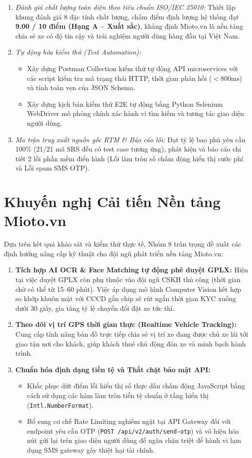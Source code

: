 \documentclass[12pt,a4paper,oneside]{report}
\begin{document}
\begin{enumerate}
  \item \textit{Đánh giá chất lượng toàn diện theo tiêu chuẩn ISO/IEC 25010:} Thiết lập khung đánh giá 8 đặc tính chất lượng, chấm điểm định lượng hệ thống đạt \textbf{9.00 / 10 điểm (Hạng A -- Xuất sắc)}, khẳng định Mioto.vn là nền tảng chia sẻ xe có độ tin cậy và trải nghiệm người dùng hàng đầu tại Việt Nam.
  \item \textit{Tự động hóa kiểm thử (Test Automation):}
    \begin{itemize}
      \item Xây dựng Postman Collection kiểm thử tự động API microservices với các script kiểm tra mã trạng thái HTTP, thời gian phản hồi ($< 800\text{ms}$) và tính toàn vẹn của JSON Schema.
      \item Xây dựng kịch bản kiểm thử E2E tự động bằng Python Selenium WebDriver mô phỏng chính xác hành vi tìm kiếm và tương tác giao diện người dùng.
    \end{itemize}
  \item \textit{Ma trận truy xuất nguồn gốc RTM \& Báo cáo lỗi:} Đạt tỷ lệ bao phủ yêu cầu 100\% (21/21 mã SRS đều có test case tương ứng), phát hiện và báo cáo chi tiết 2 lỗi phần mềm điển hình (Lỗi làm tròn số chấm động hiển thị cước phí và Lỗi spam SMS OTP).
\end{enumerate}

\section{Khuyến nghị Cải tiến Nền tảng Mioto.vn}
Dựa trên kết quả khảo sát và kiểm thử thực tế, Nhóm 8 trân trọng đề xuất các định hướng nâng cấp kỹ thuật cho đội ngũ phát triển nền tảng Mioto.vn:
\begin{enumerate}
  \item \textbf{Tích hợp AI OCR \& Face Matching tự động phê duyệt GPLX:} Hiện tại việc duyệt GPLX còn phụ thuộc vào đội ngũ CSKH thủ công (thời gian chờ có thể từ 15--60 phút). Việc áp dụng mô hình Computer Vision kết hợp so khớp khuôn mặt với CCCD gắn chip sẽ rút ngắn thời gian KYC xuống dưới 30 giây, gia tăng tỷ lệ chuyển đổi đặt xe tức thì.
  \item \textbf{Theo dõi vị trí GPS thời gian thực (Realtime Vehicle Tracking):} Cung cấp tính năng bản đồ trực tiếp chia sẻ vị trí xe đang được chủ xe lái tới giao tận nơi cho khách, giúp khách thuê chủ động đón xe và minh bạch hành trình.
  \item \textbf{Chuẩn hóa định dạng tiền tệ và Thắt chặt bảo mật API:}
    \begin{itemize}
      \item Khắc phục dứt điểm lỗi hiển thị số thực dấu chấm động JavaScript bằng cách sử dụng các hàm làm tròn tiền tệ chuẩn ở tầng hiển thị (\texttt{Intl.NumberFormat}).
      \item Bổ sung cơ chế Rate Limiting nghiêm ngặt tại API Gateway đối với endpoint yêu cầu OTP (\texttt{POST /api/v2/auth/send-otp}) và vô hiệu hóa nút gửi lại trên giao diện người dùng để ngăn chặn triệt để hành vi lạm dụng SMS gateway gây thiệt hại tài chính.
    \end{itemize}
\end{enumerate}
\end{document}
